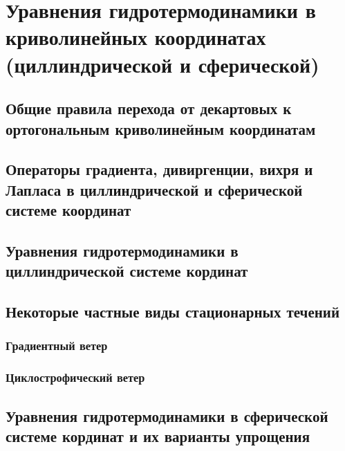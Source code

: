 \chapter{Уравнения гидротермодинамики в криволинейных координатах (циллиндрической и сферической)}
    \lipsum[1-2]

\section{Общие правила перехода от декартовых к ортогональным криволинейным координатам}
    \lipsum[1-2]

\section{Операторы градиента, дивиргенции, вихря и Лапласа в циллиндрической и сферической системе координат}
    \lipsum[1-2]

\section{Уравнения гидротермодинамики в циллиндрической системе кординат}
    \lipsum[1-2]

\section{Некоторые частные виды стационарных течений}
    \lipsum[1-2]

\subsection{Градиентный ветер}
    \lipsum[1-2]

\subsection{Циклострофический ветер}
    \lipsum[1-2]

\section{Уравнения гидротермодинамики в сферической системе кординат и их варианты упрощения}
    \lipsum[1-2]


